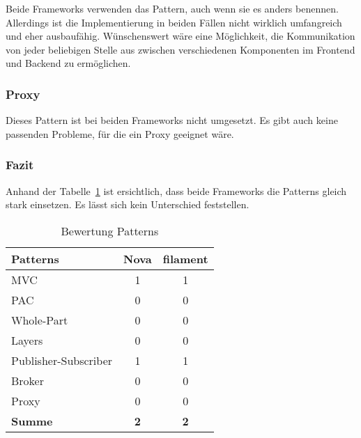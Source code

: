 Beide Frameworks verwenden das Pattern, auch wenn sie es anders benennen.
Allerdings ist die Implementierung in beiden Fällen nicht wirklich umfangreich und eher ausbaufähig.
Wünschenswert wäre eine Möglichkeit, die Kommunikation von jeder beliebigen Stelle aus zwischen verschiedenen Komponenten im Frontend und Backend zu ermöglichen.

\subsubsection{Proxy}
Dieses Pattern ist bei beiden Frameworks nicht umgesetzt.
Es gibt auch keine passenden Probleme, für die ein Proxy geeignet wäre.

\subsubsection{Fazit}
Anhand der Tabelle~\ref{tab:bewertung-patterns} ist ersichtlich, dass beide Frameworks die Patterns gleich stark einsetzen.
Es lässt sich kein Unterschied feststellen.

\begin{table}[]
    \caption{Bewertung Patterns}
    \label{tab:bewertung-patterns}
    \centering
    \begin{tabular}{|l|c|c|}
        \hline
        \textbf{Patterns}    & \textbf{Nova} & \textbf{filament} \\ \hline
        MVC                  & 1             & 1                 \\ \hline
        PAC                  & 0             & 0                 \\ \hline
        Whole-Part           & 0             & 0                 \\ \hline
        Layers               & 0             & 0                 \\ \hline
        Publisher-Subscriber & 1             & 1                 \\ \hline
        Broker               & 0             & 0                 \\ \hline
        Proxy                & 0             & 0                 \\ \hline
        \textbf{Summe}       & \textbf{2}    & \textbf{2}        \\ \hline
    \end{tabular}
\end{table}
